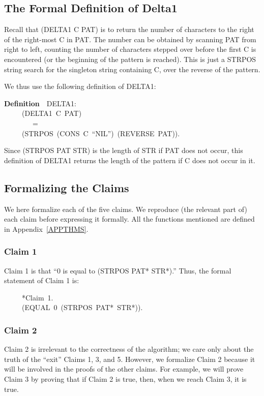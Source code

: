 \documentclass[10pt]{book}
\newenvironment{pubasis}{\begin{flushleft}}{\end{flushleft}}
\newcommand{\axiomordefinition}[1]{\vspace{6pt}\Large\textsf{\textbf{#1}}\normalsize}
\begin{document}
\subsection{The Formal Definition of Delta1}
Recall that (DELTA1 C PAT) is to return the number of characters to the
right of the right-most C in PAT.  The number can be obtained by
scanning PAT from right to left, counting the number of characters stepped
over before the first C is encountered (or the beginning of the
pattern is reached).  This is just a STRPOS string search for
the singleton string containing C, over the reverse of the pattern.

We thus  use the following definition of DELTA1:
\begin{pubasis}
\axiomordefinition{Definition}~~DELTA1:\\
~~~~~(DELTA1~C~PAT)\\
~~~~~~~~=\\
~~~~~(STRPOS~(CONS~C~``NIL'')~(REVERSE~PAT)).\\
\end{pubasis}
Since (STRPOS PAT STR) is the length of STR if PAT does not occur,
this definition of DELTA1 returns the length of the pattern if C does not occur
in it.
\subsection{Formalizing the Claims}
We  here formalize each of the five claims.  We reproduce (the relevant part of) each claim before
expressing it formally.  All the functions mentioned are defined in Appendix~\ref{APPTHMS}.

\subsubsection{Claim 1}
Claim 1 is that ``0 is equal to (STRPOS PAT* STR*).''
Thus, the formal statement of Claim 1 is:
\begin{pubasis}
~~~~~*Claim~1.\\
~~~~~(EQUAL~0~(STRPOS~PAT*~STR*)).\\
\end{pubasis}
\subsubsection{Claim 2}
Claim 2 is irrelevant to the correctness of the algorithm;
we care only about the truth of the ``exit'' Claims 1, 3, and 5.
However, we  formalize Claim 2 because it will be involved in the
proofs of the other claims.  For example, we will prove Claim 3 by proving that if
Claim 2 is true, then, when we reach Claim 3, it is true.
\end{document}
